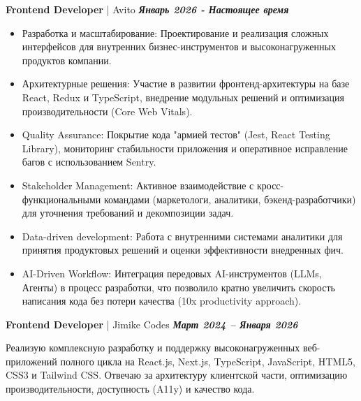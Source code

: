\documentclass[a4paper,11pt]{article}
\newcommand{\entry}[3]{%
  \noindent\textbf{#1} | #2 \hfill \textbf{\textit{#3}} \par
}
\begin{document}
\entry{Frontend Developer}{Avito}{Январь 2026 - Настоящее время}
\begin{itemize}
    \item Разработка и масштабирование: Проектирование и реализация сложных интерфейсов для внутренних бизнес-инструментов и высоконагруженных продуктов компании.
    
    \item Архитектурные решения: Участие в развитии фронтенд-архитектуры на базе React, Redux и TypeScript, внедрение модульных решений и оптимизация производительности (Core Web Vitals).

    \item Quality Assurance: Покрытие кода "армией тестов" (Jest, React Testing Library), мониторинг стабильности приложения и оперативное исправление багов с использованием Sentry.

    \item Stakeholder Management: Активное взаимодействие с кросс-функциональными командами (маркетологи, аналитики, бэкенд-разработчики) для уточнения требований и декомпозиции задач.

    \item Data-driven development: Работа с внутренними системами аналитики для принятия продуктовых решений и оценки эффективности внедренных фич.

    \item AI-Driven Workflow: Интеграция передовых AI-инструментов (LLMs, Агенты) в процесс разработки, что позволило кратно увеличить скорость написания кода без потери качества (10x productivity approach).
\end{itemize}
\vspace{1ex}

\entry{Frontend Developer}{Jimike Codes}{Март 2024 – Января 2026}
Реализую комплексную разработку и поддержку высоконагруженных веб-приложений полного цикла на React.js, Next.js, TypeScript, JavaScript, HTML5, CSS3 и Tailwind CSS. Отвечаю за архитектуру клиентской части, оптимизацию производительности, доступность (A11y) и качество кода.
\end{document}
